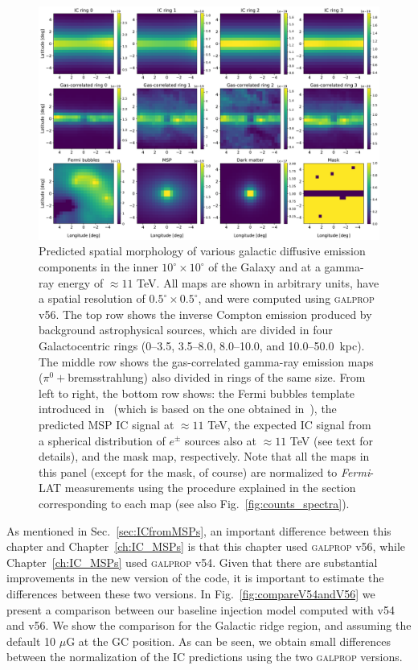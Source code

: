 \documentclass[doublespace,nopageskip]{VTthesis}
\begin{document}
\begin{figure}[htb!]
    \centering
    \includegraphics[width=\textwidth]{Figures/CTA/maps_orig.pdf}
    \caption{Predicted spatial morphology of various galactic diffusive emission components in the inner $10^\circ \times 10^\circ$ of the Galaxy and at a gamma-ray energy of $\approx 11$ TeV. All maps are shown in arbitrary units, have a spatial resolution of $0.5^\circ \times 0.5^\circ$, and were computed using \textsc{galprop} v56. The top row shows the inverse Compton emission produced by background astrophysical sources, which are divided in four Galactocentric rings (0--3.5, 3.5--8.0, 8.0--10.0, and 10.0--50.0~kpc). The middle row shows the gas-correlated gamma-ray emission maps ($\pi^0+$bremsstrahlung) also divided in rings of the same size. From left to right, the bottom row shows: the Fermi bubbles template introduced in~\citet{2019JCAP...09..042M} (which is based on the one obtained in~\citet{2014ApJ...793...64A}), the predicted MSP IC signal at $\approx 11$ TeV, the expected IC signal from a spherical distribution of $e^{\pm}$ sources also at $\approx 11$ TeV (see text for details), and the mask map, respectively. Note that all the maps in this panel (except for the mask, of course) are normalized to \textit{Fermi}-LAT measurements using the procedure explained in the section corresponding to each map (see also Fig.~\ref{fig:counts_spectra}).}
    \label{fig:galpropmaps}
\end{figure}

As mentioned in Sec.~\ref{sec:ICfromMSPs}, an important difference between this chapter and Chapter~\ref{ch:IC_MSPs} is that this chapter used \textsc{galprop} v56, while Chapter~\ref{ch:IC_MSPs} used \textsc{galprop} v54. Given that there are substantial improvements in the new version of the code, it is important to estimate the differences between these two versions. In Fig.~\ref{fig:compareV54andV56} we present a comparison between our baseline injection model computed with v54 and v56. We show the comparison for the Galactic ridge region, and assuming the default 10 $\mu$G at the GC position. As can be seen, we obtain small differences between the normalization of the IC predictions using the two \textsc{galprop} versions.
\end{document}

